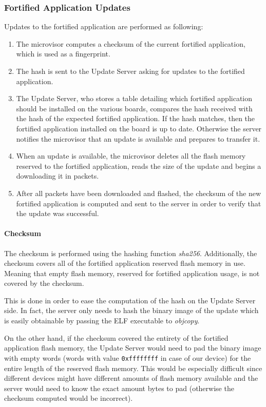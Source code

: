 \documentclass{article}
\begin{document}
\subsubsection{Fortified Application Updates}
Updates to the fortified application are performed as following:
\begin{enumerate}
	\item The microvisor computes a checksum of the current fortified application, which is used as a fingerprint.
	\item The hash is sent to the Update Server asking for updates to the fortified application.
	\item The Update Server, who stores a table detailing which fortified application should be installed on the various boards, compares the hash received with the hash of the expected fortified application. If the hash matches, then the fortified application installed on the board is up to date. Otherwise the server notifies the microvisor that an update is available and prepares to transfer it.
	\item When an update is available, the microvisor deletes all the flash memory reserved to the fortified application, reads the size of the update and begins a downloading it in packets.
	\item After all packets have been downloaded and flashed, the checksum of the new fortified application is computed and sent to the server in order to verify that the update was successful.
\end{enumerate}

\paragraph{Checksum}
The checksum is performed using the hashing function \textit{sha256}. Additionally, the checksum covers all of the fortified application reserved flash memory in use. Meaning that empty flash memory, reserved for fortified application usage, is not covered by the checksum.

This is done in order to ease the computation of the hash on the Update Server side. In fact, the server only needs to hash the binary image of the update which is easily obtainable by passing the ELF executable to \textit{objcopy}.

On the other hand, if the checksum covered the entirety of the fortified application flash memory, the Update Server would need to pad the binary image with empty words (words with value \verb|0xffffffff| in case of our device) for the entire length of the reserved flash memory. This would be especially difficult since different devices might have different amounts of flash memory available and the server would need to know the exact amount bytes to pad (otherwise the checksum computed would be incorrect).
\end{document}

